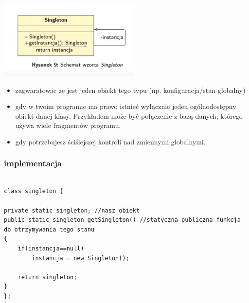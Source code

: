 \documentclass[11pt]{article}
\begin{document}
\begin{center}
\includegraphics[width=.9\linewidth]{./singleton.png}
\end{center}
\begin{itemize}
\item zagwaratowac ze jest jeden obiekt tego typu (np. konfiguracja/stan globalny)
\item gdy w twoim programie ma prawo istnieć wyłącznie jeden ogólnodostępny obiekt danej klasy. Przykładem może być połączenie z bazą danych, którego używa wiele fragmentów programu.
\item gdy potrzebujesz ściślejszej kontroli nad zmiennymi globalnymi.
\end{itemize}
\subsubsection{implementacja}
\label{sec:orgc98e028}
\begin{verbatim}

class singleton {

private static singleton; //nasz obiekt
public static singleton getSingleton() //statyczna publiczna funkcja do otrzymywania tego stanu
{
	if(instancja==null)
		instancja = new Singleton();

	return singleton;
}
};

\end{verbatim}
\end{document}
